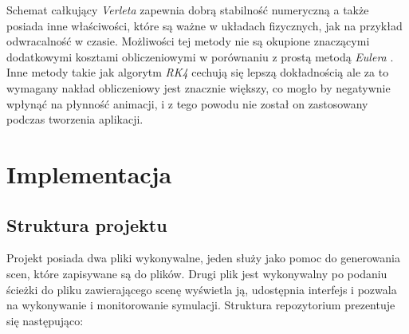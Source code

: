 \documentclass[12pt, letterpaper]{report}
\begin{document}
    Schemat całkujący \emph{Verleta} zapewnia dobrą stabilność numeryczną a także posiada inne właściwości, które 
    są ważne w układach fizycznych, jak na przykład odwracalność w czasie. Możliwości tej metody nie są 
    okupione znaczącymi dodatkowymi kosztami obliczeniowymi w porównaniu z prostą metodą \emph{Eulera} \cite{numerical}. 
    Inne metody takie jak algorytm \emph{RK4} cechują się lepszą dokładnością ale za 
    to wymagany nakład obliczeniowy jest znacznie większy, co mogło by negatywnie wpłynąć na płynność animacji,
    i z tego powodu nie został on zastosowany podczas tworzenia aplikacji. \\


\chapter{Implementacja}

    \section{Struktura projektu}
    Projekt posiada dwa pliki wykonywalne, jeden służy jako pomoc do generowania scen, które zapisywane są 
    do plików. Drugi plik jest wykonywalny po podaniu ścieżki do pliku zawierającego scenę wyświetla ją, 
    udostępnia interfejs i pozwala na wykonywanie i monitorowanie symulacji. Struktura repozytorium
    prezentuje się następująco: \\

\end{document}
